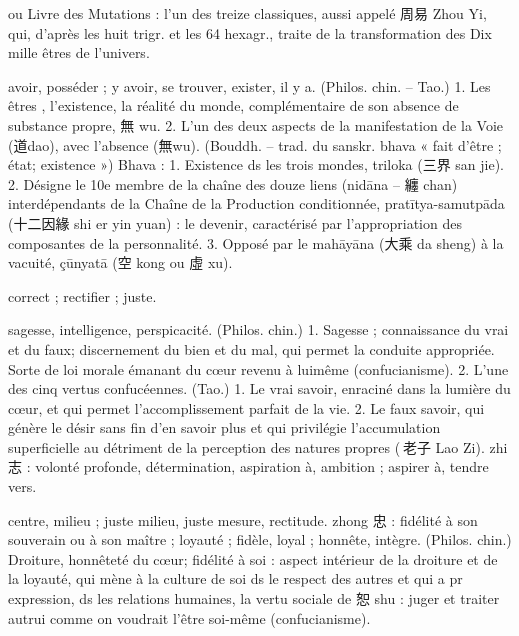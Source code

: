 \begin{Def}[易經 Yi Jing]
    ou Livre des Mutations : l’un des treize classiques, aussi appelé 周易 Zhou Yi, qui, d’après les huit trigr. et les 64 hexagr., traite de la transformation des Dix mille êtres de l’univers. 
\end{Def}
\begin{Def}[you 有]
    avoir, posséder ; y avoir, se trouver, exister, il y a. (Philos. chin. – Tao.) 1. Les êtres , l’existence, la réalité du monde, complémentaire de son absence de substance propre, 無 wu. 2. L’un des deux aspects de la manifestation de la Voie (道dao), avec l’absence (無wu). (Bouddh. – trad. du sanskr. bhava « fait d’être ; état; existence ») Bhava : 1. Existence ds les trois mondes, triloka (三界 san jie). 2. Désigne le 10e membre de la chaîne des douze liens (nidāna – 纏 chan) interdépendants de la Chaîne de la Production conditionnée, pratītya-samutpāda (十二因緣 shi er yin yuan) : le devenir, caractérisé par l’appropriation des composantes de la personnalité. 3. Opposé par le mahāyāna (大乘 da sheng) à la vacuité, çūnyatā (空 kong ou 虛 xu). 
\end{Def}
\begin{Def}[zheng 正]
    correct ; rectifier ; juste.  
\end{Def}
\begin{Def}[zhi 智]
    sagesse, intelligence, perspicacité. (Philos. chin.) 1. Sagesse ; connaissance du vrai et du faux; discernement du bien et du mal, qui permet la conduite appropriée. Sorte de loi morale émanant du cœur revenu à luimême (confucianisme). 2. L’une des cinq vertus confucéennes. (Tao.) 1. Le vrai savoir, enraciné dans la lumière du cœur, et qui permet l’accomplissement parfait de la vie. 2. Le faux savoir, qui génère le désir sans fin d’en savoir plus et qui privilégie l’accumulation superficielle au détriment de la perception des natures propres ( 老子 Lao Zi). zhi 志 : volonté profonde, détermination, aspiration à, ambition ; aspirer à, tendre vers.
\end{Def}
\begin{Def}[zhong 中]
    centre, milieu ; juste milieu, juste mesure, rectitude. zhong 忠 : fidélité à son souverain ou à son maître ; loyauté ; fidèle, loyal ; honnête, intègre. (Philos. chin.)     Droiture, honnêteté du cœur; fidélité à soi : aspect intérieur de la droiture et de la loyauté, qui mène à la culture de soi ds le respect des autres et qui a pr expression, ds les relations humaines, la vertu sociale de 恕 shu : juger et traiter autrui comme on voudrait l’être soi-même (confucianisme). 
\end{Def}
 
